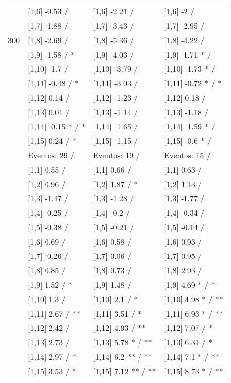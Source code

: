 \begin{table}
\begin{tabular}[t]{llll}
 & {}[1,6] -0.53  / & {}[1,6] -2.21  / & {}[1,6] -2  /\\
 & {}[1,7] -1.88  / & {}[1,7] -3.43  / & {}[1,7] -2.95  /\\
300 & {}[1,8] -2.69  / & {}[1,8] -5.36  / & {}[1,8] -4.22  /\\
\addlinespace
 & {}[1,9] -1.58  / * & {}[1,9] -4.03  / & {}[1,9] -1.71 * /\\
 & {}[1,10] -1.7  / & {}[1,10] -3.79  / & {}[1,10] -1.73 * /\\
 & {}[1,11] -0.48  / * & {}[1,11] -3.03  / & {}[1,11] -0.72 * / *\\
 & {}[1,12] 0.14  / & {}[1,12] -1.23  / & {}[1,12] 0.18  /\\
 & {}[1,13] 0.01  / & {}[1,13] -1.14  / & {}[1,13] -1.18  /\\
\addlinespace
 & {}[1,14] -0.15 * / * & {}[1,14] -1.65  / & {}[1,14] -1.59 * /\\
 & {}[1,15] 0.24  / * & {}[1,15] -1.15  / & {}[1,15] -0.6 * /\\
 & Eventos:  29 / & Eventos:  19 / & Eventos:  15 /\\
 & {}[1,1] 0.55  / & {}[1,1] 0.66  / & {}[1,1] 0.63  /\\
 & {}[1,2] 0.96  / & {}[1,2] 1.87  / * & {}[1,2] 1.13  /\\
\addlinespace
 & {}[1,3] -1.47  / & {}[1,3] -1.28  / & {}[1,3] -1.77  /\\
 & {}[1,4] -0.25  / & {}[1,4] -0.2  / & {}[1,4] -0.34  /\\
 & {}[1,5] -0.38  / & {}[1,5] -0.21  / & {}[1,5] -0.14  /\\
 & {}[1,6] 0.69  / & {}[1,6] 0.58  / & {}[1,6] 0.93  /\\
 & {}[1,7] -0.26  / & {}[1,7] 0.06  / & {}[1,7] 0.95  /\\
\addlinespace
500 & {}[1,8] 0.85  / & {}[1,8] 0.73  / & {}[1,8] 2.93  /\\
 & {}[1,9] 1.52  / * & {}[1,9] 1.48  / & {}[1,9] 4.69 * / *\\
 & {}[1,10] 1.3  / & {}[1,10] 2.1  / * & {}[1,10] 4.98 * / **\\
 & {}[1,11] 2.67  / ** & {}[1,11] 3.51  / * & {}[1,11] 6.93 * / **\\
 & {}[1,12] 2.42  / & {}[1,12] 4.93  / ** & {}[1,12] 7.07  / *\\
\addlinespace
 & {}[1,13] 2.73  / & {}[1,13] 5.78 * / ** & {}[1,13] 6.31  / *\\
 & {}[1,14] 2.97  / * & {}[1,14] 6.2 ** / ** & {}[1,14] 7.1 * / **\\
 & {}[1,15] 3.53  / * & {}[1,15] 7.12 ** / ** & {}[1,15] 8.73 * / **\\
\bottomrule
\end{tabular}
\end{table}

